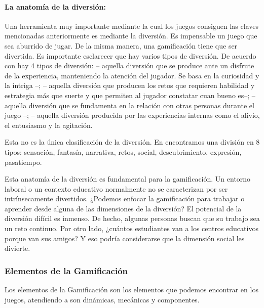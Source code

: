 \paragraph{La anatomía de la diversión: }

Una herramienta muy importante mediante la cual los juegos consiguen las claves mencionadas anteriormente es mediante la diversión.
%
Es impensable un juego que sea aburrido de jugar.
%
De la misma manera, una gamificación tiene que ser divertida.
%
Es importante esclarecer que hay varios tipos de diversión.
%
De acuerdo con \cite{whyweplaygames} hay 4 tipos de diversión: 
%
 -- aquella diversión que se produce ante un disfrute de la experiencia, manteniendo la atención del jugador. Se basa en la curiosidad y la intriga --;
%
  -- aquella diversión que producen los retos que requieren habilidad y estrategia más que suerte y que permiten al jugador constatar cuan bueno es--;
%
 -- aquella diversión que se fundamenta en la relación con otras personas durante el juego --;
%
 -- aquella diversión producida por las experiencias internas como el alivio, el entusiasmo y la agitación.

Esta no es la única clasificación de la diversión.
%
En \cite{MDA} encontramos una división en 8 tipos: sensación, fantasía, narrativa, retos, social, descubrimiento, expresión, pasatiempo.
%
\label{AnatomyOfFun}
%

Esta anatomía de la diversión es fundamental para la gamificación.
%
Un entorno laboral o un contexto educativo normalmente no se caracterizan por ser intrínsecamente divertidos.
%
¿Podemos enfocar la gamificación para trabajar o aprender desde alguna de las dimensiones de la diversión? 
%
El potencial de la diversión difícil es inmenso. 
%
De hecho, algunas personas buscan que su trabajo sea un reto continuo.
%
Por otro lado, ¿cuántos estudiantes van a los centros educativos porque van sus amigos?
%
Y eso podría considerarse que la dimensión social les divierte.



\subsubsection{Elementos de la Gamificación}
Los elementos de la Gamificación son los elementos que podemos encontrar en los juegos, atendiendo a \cite{Hunicke04mda:a} son dinámicas, mecánicas y componentes.

